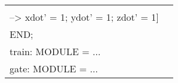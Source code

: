 \documentclass{llncs}
\begin{document}
\begin{figure}[htb!]
\begin{tt}
\begin{tabular}{ll}
\begin{minipage}{2in}
\begin{tabbing}
\\ \> \> \> \>
 --> xdot' = 1; ydot' = 1; zdot' = 1$]$
\\ \>
END;
\\ \>
train: MODULE = $\ldots$
\\ \>
gate: MODULE = $\ldots$

\end{tabbing}
\end{minipage}
\end{tabular}
\end{tt}
\end{figure}
\end{document}
